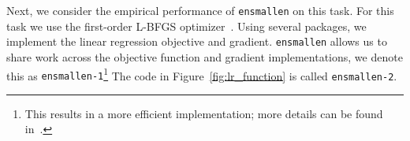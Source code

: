 \documentclass[twoside,11pt]{article}
\begin{document}



Next, we consider the empirical performance of {\tt ensmallen} on this task.
For this task we use the first-order L-BFGS
optimizer~\cite{liu1989limited}.%
Using several packages, we implement
the linear regression objective and gradient.  {\tt ensmallen}
allows us to share work across the objective function and gradient
implementations, we denote this as {\tt ensmallen-1}\footnote{This results in a
more efficient implementation; more details can be found in~\citet{ensmallen2020}.}
The code in Figure~\ref{fig:lr_function} is called \texttt{ensmallen-2}.
\end{document}
